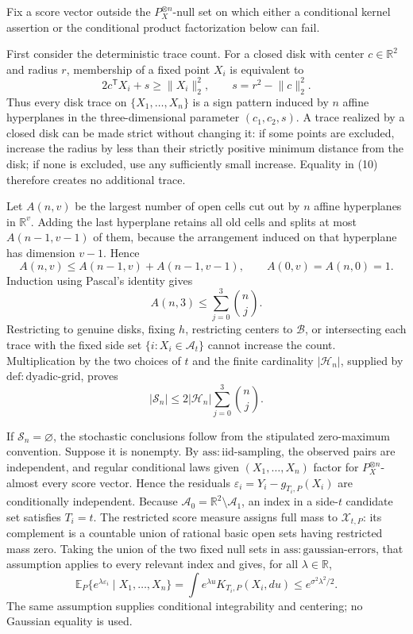 Fix a score vector outside the \(P_X^{\otimes n}\)-null set on which either a conditional kernel assertion or the conditional product factorization below can fail.

First consider the deterministic trace count.  For a closed disk with center \(c\in\mathbb R^2\) and radius \(r\), membership of a fixed point \(X_i\) is equivalent to
\[
 2c^{\mathsf T}X_i+s\ge \lVert X_i\rVert_2^2,
 \qquad s=r^2-\lVert c\rVert_2^2. \tag{10}
\]
Thus every disk trace on \(\{X_1,\ldots,X_n\}\) is a sign pattern induced by \(n\) affine hyperplanes in the three-dimensional parameter \((c_1,c_2,s)\).  A trace realized by a closed disk can be made strict without changing it: if some points are excluded, increase the radius by less than their strictly positive minimum distance from the disk; if none is excluded, use any sufficiently small increase.  Equality in (10) therefore creates no additional trace.

Let \(A(n,v)\) be the largest number of open cells cut out by \(n\) affine hyperplanes in \(\mathbb R^v\).  Adding the last hyperplane retains all old cells and splits at most \(A(n-1,v-1)\) of them, because the arrangement induced on that hyperplane has dimension \(v-1\).  Hence
\[
 A(n,v)\le A(n-1,v)+A(n-1,v-1),
 \qquad A(0,v)=A(n,0)=1. \tag{11}
\]
Induction using Pascal's identity gives
\[
 A(n,3)\le\sum_{j=0}^3\binom nj. \tag{12}
\]
Restricting to genuine disks, fixing \(h\), restricting centers to \(\mathcal B\), or intersecting each trace with the fixed side set \(\{i:X_i\in\mathcal A_t\}\) cannot increase the count.  Multiplication by the two choices of \(t\) and the finite cardinality \(|\mathcal H_n|\), supplied by \(\mathrm{def:dyadic\text{-}grid}\), proves
\[
 |\mathscr S_n|\le2|\mathcal H_n|\sum_{j=0}^3\binom nj. \tag{13}
\]

If \(\mathscr S_n=\varnothing\), the stochastic conclusions follow from the stipulated zero-maximum convention.  Suppose it is nonempty.  By \(\mathrm{ass:iid\text{-}sampling}\), the observed pairs are independent, and regular conditional laws given \((X_1,\ldots,X_n)\) factor for \(P_X^{\otimes n}\)-almost every score vector.  Hence the residuals \(\varepsilon_i=Y_i-g_{T_i,P}(X_i)\) are conditionally independent.  Because \(\mathcal A_0=\mathbb R^2\setminus\mathcal A_1\), an index in a side-\(t\) candidate set satisfies \(T_i=t\).  The restricted score measure assigns full mass to \(\mathcal X_{t,P}\): its complement is a countable union of rational basic open sets having restricted mass zero.  Taking the union of the two fixed null sets in \(\mathrm{ass:gaussian\text{-}errors}\), that assumption applies to every relevant index and gives, for all \(\lambda\in\mathbb R\),
\[
 \mathbb E_P\{e^{\lambda\varepsilon_i}\mid X_1,\ldots,X_n\}
 =\int e^{\lambda u}K_{T_i,P}(X_i,du)
 \le e^{\sigma^2\lambda^2/2}. \tag{14}
\]
The same assumption supplies conditional integrability and centering; no Gaussian equality is used.

